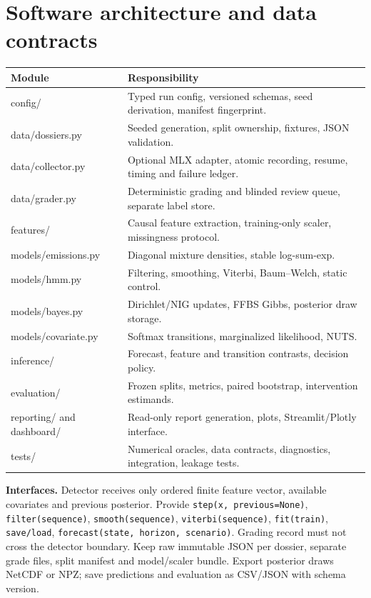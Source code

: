 \documentclass[11pt,letterpaper]{article}
\newcommand{\sectionpage}[1]{\clearpage\section{#1}}
\begin{document}
\sectionpage{Software architecture and data contracts}

\begin{tabularx}{\linewidth}{p{.36\linewidth}X}
\toprule Module & Responsibility \\ \midrule
config/ & Typed run config, versioned schemas, seed derivation, manifest fingerprint. \\
data/dossiers.py & Seeded generation, split ownership, fixtures, JSON validation. \\
data/collector.py & Optional MLX adapter, atomic recording, resume, timing and failure ledger. \\
data/grader.py & Deterministic grading and blinded review queue, separate label store. \\
features/ & Causal feature extraction, training-only scaler, missingness protocol. \\
models/emissions.py & Diagonal mixture densities, stable log-sum-exp. \\
models/hmm.py & Filtering, smoothing, Viterbi, Baum--Welch, static control. \\
models/bayes.py & Dirichlet/NIG updates, FFBS Gibbs, posterior draw storage. \\
models/covariate.py & Softmax transitions, marginalized likelihood, NUTS. \\
inference/ & Forecast, feature and transition contrasts, decision policy. \\
evaluation/ & Frozen splits, metrics, paired bootstrap, intervention estimands. \\
reporting/ and dashboard/ & Read-only report generation, plots, Streamlit/Plotly interface. \\
tests/ & Numerical oracles, data contracts, diagnostics, integration, leakage tests. \\ \bottomrule
\end{tabularx}

\textbf{Interfaces.} Detector receives only ordered finite feature vector, available covariates and previous posterior. Provide \texttt{step(x, previous=None)}, \texttt{filter(sequence)}, \texttt{smooth(sequence)}, \texttt{viterbi(sequence)}, \texttt{fit(train)}, \texttt{save/load}, \texttt{forecast(state, horizon, scenario)}. Grading record must not cross the detector boundary. Keep raw immutable JSON per dossier, separate grade files, split manifest and model/scaler bundle. Export posterior draws NetCDF or NPZ; save predictions and evaluation as CSV/JSON with schema version.
\end{document}
